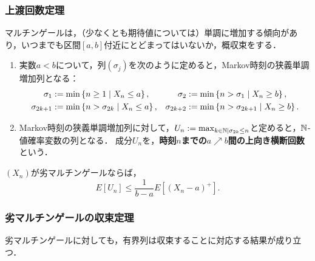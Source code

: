 \documentclass[uplatex,dvipdfmx]{jsreport}
\begin{document}
\subsubsection{上渡回数定理}

\begin{tcolorbox}[colframe=ForestGreen, colback=ForestGreen!10!white,breakable,colbacktitle=ForestGreen!40!white,coltitle=black,fonttitle=\bfseries\sffamily,
title=]
    マルチンゲールは，（少なくとも期待値については）単調に増加する傾向があり，いつまでも区間$[a,b]$付近にとどまってはいないか，概収束をする．
\end{tcolorbox}

\begin{definition}\mbox{}
    \begin{enumerate}
        \item 実数$a<b$について，列$(\sigma_j)$を次のように定めると，Markov時刻の狭義単調増加列となる：
        \begin{align*}
            \sigma_1&:=\min\left\{n\ge 1\mid X_n\le a\right\},&\sigma_2&:=\min\left\{n>\sigma_1\mid X_n\ge b\right\},\\
            \sigma_{2k+1}&:=\min\left\{n>\sigma_{2k}\mid X_n\le a\right\},&\sigma_{2k+2}&:=\min\left\{n>\sigma_{2k+1}\mid X_n\ge b\right\}.
        \end{align*}
        \item Markov時刻の狭義単調増加列に対して，$U_n:=\max_{k\in\mathbb{N}\mid\sigma_{2k}\le n}$と定めると，$\mathbb{N}$-値確率変数の列となる．
        成分$U_n$を，\textbf{時刻$n$までの$a\nearrow b$間の上向き横断回数}という．
    \end{enumerate}
\end{definition}

\begin{theorem}
    $(X_n)$が劣マルチンゲールならば，
    \[E[U_n]\le\frac{1}{b-a}E[(X_n-a)^+].\]
\end{theorem}

\subsubsection{劣マルチンゲールの収束定理}

\begin{tcolorbox}[colframe=ForestGreen, colback=ForestGreen!10!white,breakable,colbacktitle=ForestGreen!40!white,coltitle=black,fonttitle=\bfseries\sffamily,
title=]
    劣マルチンゲールに対しても，有界列は収束することに対応する結果が成り立つ．
\end{tcolorbox}
\end{document}
